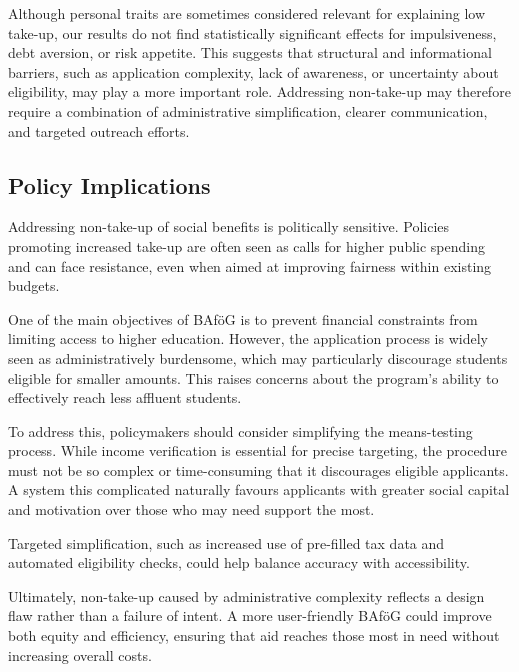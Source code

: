 Although personal traits are sometimes considered relevant for explaining low take-up, our results do not find statistically significant effects for impulsiveness, debt aversion, or risk appetite. 
This suggests that structural and informational barriers, such as application complexity, lack of awareness, or uncertainty about eligibility, may play a more important role. 
Addressing non-take-up may therefore require a combination of administrative simplification, clearer communication, and targeted outreach efforts.

\subsection{Policy Implications}

Addressing non-take-up of social benefits is politically sensitive. 
Policies promoting increased take-up are often seen as calls for higher public spending and can face resistance, even when aimed at improving fairness within existing budgets.

One of the main objectives of BAföG is to prevent financial constraints from limiting access to higher education. 
However, the application process is widely seen as administratively burdensome, which may particularly discourage students eligible for smaller amounts. 
This raises concerns about the program’s ability to effectively reach less affluent students.

To address this, policymakers should consider simplifying the means-testing process. While income verification is essential for precise targeting, the procedure must not be so complex or time-consuming that it discourages eligible applicants. A system this complicated naturally favours applicants with greater social capital and motivation over those who may need support the most.

Targeted simplification, such as increased use of pre-filled tax data and automated eligibility checks, could help balance accuracy with accessibility.

Ultimately, non-take-up caused by administrative complexity reflects a design flaw rather than a failure of intent. A more user-friendly BAföG could improve both equity and efficiency, ensuring that aid reaches those most in need without increasing overall costs.
